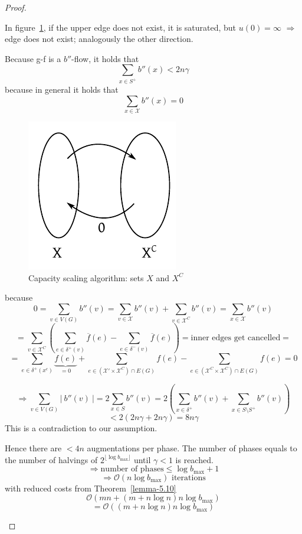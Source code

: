 \documentclass[a4paper]{article}
\theoremstyle{definition}
\newcommand{\card}[1]{\left|\:\!#1\:\!\right|}
\begin{document}
\begin{proof}
\begin{itemize}
      In figure~\ref{fig:csa-xc}, if the upper edge does not exist, it is saturated,
      but $u(0) = \infty$ $\Rightarrow$ edge does not exist; analogously the other direction.

      Because g-f is a $b''$-flow, it holds that
      \[ \sum_{x \in S^+} b''(x) < 2n\gamma \]
      because in general it holds that
      \[ \sum_{x \in \mathcal{X}} b''(x) = 0 \]

      \begin{figure}[!ht]
        \begin{center}
          \includegraphics{img/capacity_scaling_algo_proof_edge.pdf}
          \caption{Capacity scaling algorithm: sets $X$ and $X^C$}
          \label{fig:csa-xc}
        \end{center}
      \end{figure}

      because
      \[
        0 = \sum_{v \in V(G)} b''(v)
          = \sum_{v \in \mathcal{X}} b''(v) + \sum_{v \in \mathcal{X}^C} b''(v)
          = \sum_{x \in \mathcal{X}} b''(v)
      \] \[
        = \sum_{v \in \mathcal{X}^C} \left(
          \sum_{e \in \delta^+(v)} \overline{f}(e) - \sum_{e \in \delta^-(v)} \overline{f}(e)
        \right)
        = \text{inner edges get cancelled} =
      \] \[
        = \sum_{e \in \delta^+(x^c)} \underbrace{f(e)}_{=0} + \sum_{e \in (\mathcal{X}' \times \mathcal{X}^C) \cap E(G)} f(e) - \sum_{e \in (\mathcal{X}^C \times \mathcal{X}^C) \cap E(G)} f(e) = 0
      \]

      \[
        \Rightarrow \sum_{v \in V(G)} \card{b''(v)}
          = 2\sum_{x \in S} b''(v)
          = 2\left(\sum_{x \in \delta^+} b''(v) + \sum_{x \in S \setminus S^+} b''(v)\right)
      \] \[
          < 2 (2n\gamma + 2n\gamma) = 8n\gamma
      \]
      This is a contradiction to our assumption.

      Hence there are $<4n$ augmentations per phase. The number of phases equals to the number of halvings of $2^{\lfloor \log{b_{\text{max}}}\rfloor}$ until $\gamma < 1$ is reached.
      \[ \Rightarrow \text{number of phases} \leq \log{b_{\text{max}}} + 1 \]
      \[ \Rightarrow \mathcal{O}(n \log{b_{\text{max}}}) \text{ iterations} \]
      with reduced costs from Theorem~\ref{lemma-5.10}
      \[ \mathcal{O}(mn + (m + n \log{n}) n \log{b_{\text{max}}}) \]
      \[ = \mathcal{O}((m + n \log{n}) n \log{b_{\text{max}}}) \]
  \end{itemize}

\end{proof}
\end{document}
